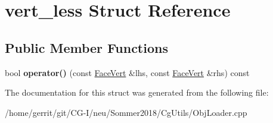 \hypertarget{structvert__less}{}\section{vert\+\_\+less Struct Reference}
\label{structvert__less}
\subsection*{Public Member Functions}
\begin{DoxyCompactItemize}
\item 
\mbox{\label{structvert__less_a0ffe4e72cbb291b3f5a5284d72d235c0}} 
bool {\bfseries operator()} (const \hyperlink{struct_face_vert}{Face\+Vert} \&lhs, const \hyperlink{struct_face_vert}{Face\+Vert} \&rhs) const
\end{DoxyCompactItemize}


The documentation for this struct was generated from the following file\+:\begin{DoxyCompactItemize}
\item 
/home/gerrit/git/\+C\+G-\/\+I/neu/\+Sommer2018/\+Cg\+Utils/Obj\+Loader.\+cpp\end{DoxyCompactItemize}

